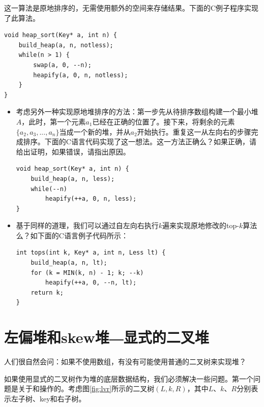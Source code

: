 \documentclass[b5paper]{ctexart}
\begin{document}
这一算法是原地排序的，无需使用额外的空间来存储结果。下面的C例子程序实现了此算法。

\lstset{language=C}
\begin{lstlisting}
void heap_sort(Key* a, int n) {
    build_heap(a, n, notless);
    while(n > 1) {
        swap(a, 0, --n);
        heapify(a, 0, n, notless);
    }
}
\end{lstlisting}

\begin{Exercise}
\begin{itemize}
\item 考虑另外一种实现原地堆排序的方法：第一步先从待排序数组构建一个最小堆$A$，此时，第一个元素$a_1$已经在正确的位置了。接下来，将剩余的元素$\{a_2, a_3, ..., a_n\}$当成一个新的堆，并从$a_2$开始执行。重复这一从左向右的步骤完成排序。下面的C语言代码实现了这一想法。这一方法正确么？如果正确，请给出证明，如果错误，请指出原因。
\lstset{language=C}
\begin{lstlisting}
void heap_sort(Key* a, int n) {
    build_heap(a, n, less);
    while(--n)
        heapify(++a, 0, n, less);
}
\end{lstlisting}

\item 基于同样的道理，我们可以通过自左向右执行$k$遍来实现原地修改的top-$k$算法么？如下面的C语言例子代码所示：
\lstset{language=C}
\begin{lstlisting}
int tops(int k, Key* a, int n, Less lt) {
    build_heap(a, n, lt);
    for (k = MIN(k, n) - 1; k; --k)
        heapify(++a, 0, --n, lt);
    return k;
}
\end{lstlisting}
\end{itemize}
\end{Exercise}

\section{左偏堆和skew堆―显式的二叉堆}
\label{ebheap}

人们很自然会问：如果不使用数组，有没有可能使用普通的二叉树来实现堆？

如果使用显式的二叉树作为堆的底层数据结构，我们必须解决一些问题。第一个问题是关于和操作的。考虑图\ref{fig:lvr}所示的二叉树$(L, k, R)$，其中$L$、$k$、$R$分别表示左子树、key和右子树。
\end{document}
